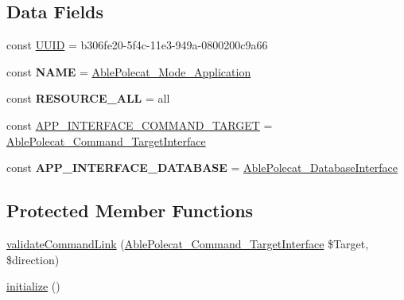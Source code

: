 \subsection*{Data Fields}
\begin{DoxyCompactItemize}
\item 
const \hyperlink{class_able_polecat___mode___application_a74b892c8c0b86bf9d04c5819898c51e7}{U\+U\+I\+D} = \textquotesingle{}b306fe20-\/5f4c-\/11e3-\/949a-\/0800200c9a66\textquotesingle{}
\item 
\hypertarget{class_able_polecat___mode___application_a244352f035b82b20b0efa506167fd862}{}const {\bfseries N\+A\+M\+E} = \textquotesingle{}\hyperlink{class_able_polecat___mode___application}{Able\+Polecat\+\_\+\+Mode\+\_\+\+Application}\textquotesingle{}\label{class_able_polecat___mode___application_a244352f035b82b20b0efa506167fd862}

\item 
\hypertarget{class_able_polecat___mode___application_a76ca3be78b6069232f9ad2abdc4f2b6e}{}const {\bfseries R\+E\+S\+O\+U\+R\+C\+E\+\_\+\+A\+L\+L} = \textquotesingle{}all\textquotesingle{}\label{class_able_polecat___mode___application_a76ca3be78b6069232f9ad2abdc4f2b6e}

\item 
const \hyperlink{class_able_polecat___mode___application_a37f6c7e337e857be96a70f2e31cadae1}{A\+P\+P\+\_\+\+I\+N\+T\+E\+R\+F\+A\+C\+E\+\_\+\+C\+O\+M\+M\+A\+N\+D\+\_\+\+T\+A\+R\+G\+E\+T} = \textquotesingle{}\hyperlink{interface_able_polecat___command___target_interface}{Able\+Polecat\+\_\+\+Command\+\_\+\+Target\+Interface}\textquotesingle{}
\item 
\hypertarget{class_able_polecat___mode___application_a780aab9b980f711c3e7b676a2137e042}{}const {\bfseries A\+P\+P\+\_\+\+I\+N\+T\+E\+R\+F\+A\+C\+E\+\_\+\+D\+A\+T\+A\+B\+A\+S\+E} = \textquotesingle{}\hyperlink{interface_able_polecat___database_interface}{Able\+Polecat\+\_\+\+Database\+Interface}\textquotesingle{}\label{class_able_polecat___mode___application_a780aab9b980f711c3e7b676a2137e042}

\end{DoxyCompactItemize}
\subsection*{Protected Member Functions}
\begin{DoxyCompactItemize}
\item 
\hyperlink{class_able_polecat___mode___application_a37906da60d0165610266b97b07bc5267}{validate\+Command\+Link} (\hyperlink{interface_able_polecat___command___target_interface}{Able\+Polecat\+\_\+\+Command\+\_\+\+Target\+Interface} \$Target, \$direction)
\item 
\hyperlink{class_able_polecat___mode___application_a91098fa7d1917ce4833f284bbef12627}{initialize} ()
\end{DoxyCompactItemize}


